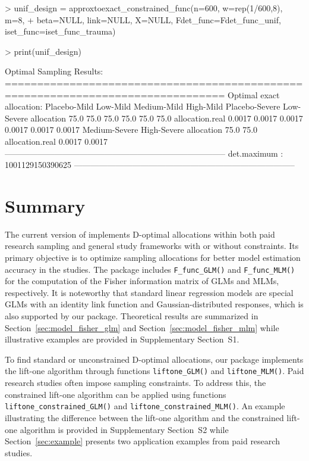 \begin{example}
> unif_design = approxtoexact_constrained_func(n=600, w=rep(1/600,8), m=8,
+ beta=NULL, link=NULL, X=NULL, Fdet_func=Fdet_func_unif, iset_func=iset_func_trauma)

> print(unif_design)

Optimal Sampling Results:
================================================================================
Optimal exact allocation:
                Placebo-Mild Low-Mild Medium-Mild High-Mild Placebo-Severe Low-Severe
allocation      75.0         75.0     75.0        75.0      75.0           75.0
allocation.real 0.0017       0.0017   0.0017      0.0017    0.0017         0.0017
                Medium-Severe High-Severe
allocation      75.0          75.0
allocation.real 0.0017        0.0017
--------------------------------------------------------------------------------
det.maximum :
1001129150390625
--------------------------------------------------------------------------------
\end{example}

\section{Summary}

The current version of  implements D-optimal allocations within both paid research sampling and general study frameworks with or without constraints. Its primary objective is to optimize sampling allocations for better model estimation accuracy in the studies. The package includes \texttt{F\_func\_GLM()} and \texttt{F\_func\_MLM()} for the computation of the Fisher information matrix of GLMs and MLMs, respectively. It is noteworthy that standard linear regression models are special GLMs with an identity link function and Gaussian-distributed responses, which is also supported by our package. Theoretical results are summarized in Section~\ref{sec:model_fisher_glm} and Section~\ref{sec:model_fisher_mlm} while illustrative examples are provided in Supplementary Section~S1.

To find standard or unconstrained D-optimal allocations, our package implements the lift-one algorithm through functions \texttt{liftone\_GLM()} and \texttt{liftone\_MLM()}. Paid research studies often impose sampling constraints. To address this, the constrained lift-one algorithm can be applied using functions \texttt{liftone\_constrained\_GLM()} and \texttt{liftone\_constrained\_MLM()}. An example illustrating the difference between the lift-one algorithm and the constrained lift-one algorithm is provided in Supplementary Section~S2 while Section~\ref{sec:example} presents two application examples from paid research studies.

